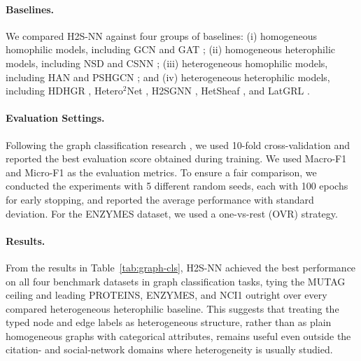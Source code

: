 \documentclass[sigconf,anonymous,review]{acmart}
\newcommand{\method}{\textsc{H2S-NN}}
\begin{document}
\paragraph{Baselines.} We compared \method{} against four groups of baselines: (i) homogeneous homophilic models, including GCN \cite{kipf2017gcn} and GAT \cite{velickovic2018gat}; (ii) homogeneous heterophilic models, including NSD \cite{bodnar2022neural} and CSNN \cite{ribeiro2026cooperative}; (iii) heterogeneous homophilic models, including HAN \cite{wang2019han} and PSHGCN \cite{he2024spectral}; and (iv) heterogeneous heterophilic models, including HDHGR \cite{guo2023homophily}, Hetero$^2$Net \cite{li2025hetero2net}, H2SGNN \cite{lu2026addressing}, HetSheaf \cite{braithwaite2024heterogeneous}, and LatGRL \cite{shen2025heterophily}.

\paragraph{Evaluation Settings.} Following the graph classification research \cite{zhang2018end, amouzad2024graphunet}, we used 10-fold cross-validation and reported the best evaluation score obtained during training. We used Macro-F1 and Micro-F1 as the evaluation metrics. To ensure a fair comparison, we conducted the experiments with 5 different random seeds, each with 100 epochs for early stopping, and reported the average performance with standard deviation. For the ENZYMES dataset, we used a one-vs-rest (OVR) strategy.

\paragraph{Results.}

From the results in Table~\ref{tab:graph-cls}, \method{} achieved the best performance on all four benchmark datasets in graph classification tasks, tying the MUTAG ceiling and leading PROTEINS, ENZYMES, and NCI1 outright over every compared heterogeneous heterophilic baseline. This suggests that treating the typed node and edge labels as heterogeneous structure, rather than as plain homogeneous graphs with categorical attributes, remains useful even outside the citation- and social-network domains where heterogeneity is usually studied.
\end{document}

